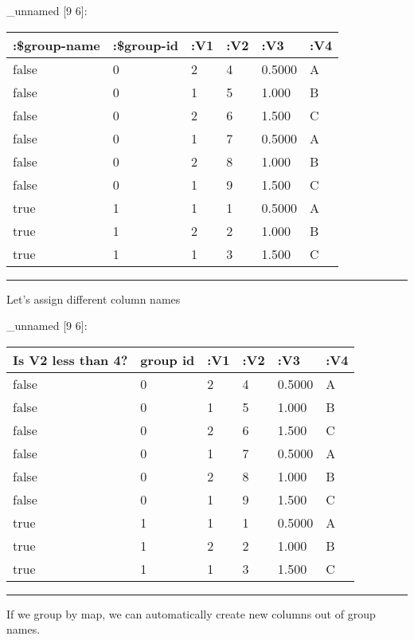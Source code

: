 \documentclass[]{article}
\newenvironment{Shaded}{\begin{snugshade}}{\end{snugshade}}
\newcommand{\KeywordTok}[1]{\textcolor[rgb]{0.13,0.29,0.53}{\textbf{#1}}}
\newcommand{\DecValTok}[1]{\textcolor[rgb]{0.00,0.00,0.81}{#1}}
\newcommand{\StringTok}[1]{\textcolor[rgb]{0.31,0.60,0.02}{#1}}
\newcommand{\VariableTok}[1]{\textcolor[rgb]{0.00,0.00,0.00}{#1}}
\newcommand{\AttributeTok}[1]{\textcolor[rgb]{0.77,0.63,0.00}{#1}}
\newcommand{\NormalTok}[1]{#1}
\begin{document}
\_unnamed {[}9 6{]}:

\begin{longtable}[]{@{}llllll@{}}
\toprule
:\$group-name & :\$group-id & :V1 & :V2 & :V3 & :V4\tabularnewline
\midrule
\endhead
false & 0 & 2 & 4 & 0.5000 & A\tabularnewline
false & 0 & 1 & 5 & 1.000 & B\tabularnewline
false & 0 & 2 & 6 & 1.500 & C\tabularnewline
false & 0 & 1 & 7 & 0.5000 & A\tabularnewline
false & 0 & 2 & 8 & 1.000 & B\tabularnewline
false & 0 & 1 & 9 & 1.500 & C\tabularnewline
true & 1 & 1 & 1 & 0.5000 & A\tabularnewline
true & 1 & 2 & 2 & 1.000 & B\tabularnewline
true & 1 & 1 & 3 & 1.500 & C\tabularnewline
\bottomrule
\end{longtable}

\begin{center}\rule{0.5\linewidth}{0.5pt}\end{center}

Let's assign different column names

\begin{Shaded}
\end{Shaded}

\_unnamed {[}9 6{]}:

\begin{longtable}[]{@{}llllll@{}}
\toprule
Is V2 less than 4? & group id & :V1 & :V2 & :V3 & :V4\tabularnewline
\midrule
\endhead
false & 0 & 2 & 4 & 0.5000 & A\tabularnewline
false & 0 & 1 & 5 & 1.000 & B\tabularnewline
false & 0 & 2 & 6 & 1.500 & C\tabularnewline
false & 0 & 1 & 7 & 0.5000 & A\tabularnewline
false & 0 & 2 & 8 & 1.000 & B\tabularnewline
false & 0 & 1 & 9 & 1.500 & C\tabularnewline
true & 1 & 1 & 1 & 0.5000 & A\tabularnewline
true & 1 & 2 & 2 & 1.000 & B\tabularnewline
true & 1 & 1 & 3 & 1.500 & C\tabularnewline
\bottomrule
\end{longtable}

\begin{center}\rule{0.5\linewidth}{0.5pt}\end{center}

If we group by map, we can automatically create new columns out of group
names.
\end{document}
